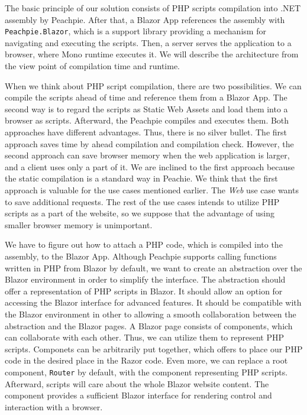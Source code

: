 The basic principle of our solution consists of PHP scripts compilation into .NET assembly by Peachpie.
After that, a Blazor App references the assembly with \texttt{Peachpie.Blazor}, which is a support library providing a mechanism for navigating and executing the scripts.
Then, a server serves the application to a browser, where Mono runtime executes it.
We will describe the architecture from the view point of compilation time and runtime.
\par
When we think about PHP script compilation, there are two possibilities.
We can compile the scripts ahead of time and reference them from a Blazor App. 
The second way is to regard the scripts as Static Web Assets and load them into a browser as scripts.
Afterward, the Peachpie compiles and executes them.
Both approaches have different advantages. 
Thus, there is no silver bullet.
The first approach saves time by ahead compilation and compilation check.
However, the second approach can save browser memory when the web application is larger, and a client uses only a part of it.
We are inclined to the first approach because the static compilation is a standard way in Peachie.
We think that the first approach is valuable for the use cases mentioned earlier.
The \textit{Web} use case wants to save additional requests. The rest of the use cases intends to utilize PHP scripts as a part of the website, so we suppose that the advantage of using smaller browser memory is unimportant. 
\par
We have to figure out how to attach a PHP code, which is compiled into the assembly, to the Blazor App.
Although Peachpie supports calling functions written in PHP from Blazor by default, we want to create an abstraction over the Blazor environment in order to simplify the interface.
The abstraction should offer a representation of PHP scripts in Blazor.
It should allow an option for accessing the Blazor interface for advanced features.
It should be compatible with the Blazor environment in other to allowing a smooth collaboration between the abstraction and the Blazor pages.
A Blazor page consists of components, which can collaborate with each other.
Thus, we can utilize them to represent PHP scripts.
Componets can be arbitrarily put together, which offers to place our PHP code in the desired place in the Razor code.
Even more, we can replace a root component, \texttt{Router} by default, with the component representing PHP scripts.
Afterward, scripts will care about the whole Blazor website content.
The component provides a sufficient Blazor interface for rendering control and interaction with a browser. 
